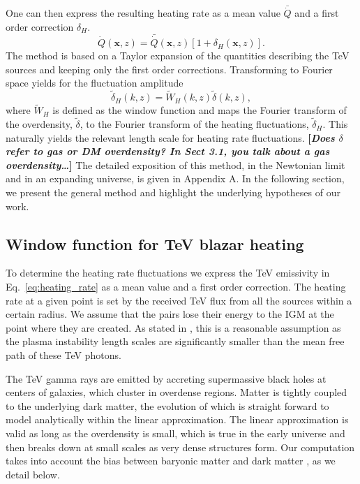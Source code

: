 \documentclass[twocolumns]{emulateapj}
\newcommand\Cc[1]{{\color{blue} \bf #1}} %
\begin{document}
One can then express the resulting heating rate as a mean value $\bar{\dot{Q}}$ and a first order correction $\delta_H$. 
\begin{equation}
  \label{eq:delta_h}
  \dot{Q}(\mathbf{x},z)=\bar{\dot{Q}}(\mathbf{x},z)\left[1+\delta_H(\mathbf{x},z)\right].
\end{equation}
 The method is based on a Taylor expansion of the quantities describing the TeV sources and keeping only the first order corrections. Transforming to Fourier space yields for the fluctuation amplitude
\begin{equation}
  \label{eq:use_window}
  \tilde{\delta}_H(k,z)=\tilde{W}_H(k,z)\tilde{\delta}(k,z),
\end{equation}
where $\tilde{W}_H$ is defined as the window function and maps the Fourier transform of the overdensity, $\tilde{\delta}$, to the Fourier transform of the heating fluctuations, $\tilde{\delta}_H$. This naturally yields the relevant length scale for heating rate fluctuations. \Cc{[{\em Does $\delta$ refer to gas or DM overdensity? In Sect 3.1, you talk about a gas overdensity\ldots}]}
The detailed exposition of this method, in the Newtonian limit and in an expanding universe, is given in Appendix A. In the following section, we present the general method and highlight the underlying hypotheses of our work.


\subsection{Window function for TeV blazar heating}\label{sec:window}
To determine the heating rate fluctuations we express the TeV emissivity in Eq.~\eqref{eq:heating_rate} as a mean value and a first order correction. The heating rate at a given point is set by the received TeV flux from all the sources within a certain radius. We assume that the pairs lose their energy to the IGM at the point where they are created.  As stated in \citet{2012ApJ...752...22B}, this is a reasonable assumption as the plasma instability length scales are significantly smaller than the mean free path of these TeV photons. 

 The TeV gamma rays are emitted by accreting supermassive black holes at centers of galaxies, which cluster in overdense regions. Matter is tightly coupled to the underlying dark matter, the evolution of which is straight forward to model analytically within the linear approximation.  The linear approximation is valid as long as the overdensity is small, which is true in the early universe and then breaks down at small scales as very dense structures form.  Our computation takes into account the bias between baryonic matter and dark matter \citep{1996MNRAS.282..347M}, as we detail below.
\end{document}
